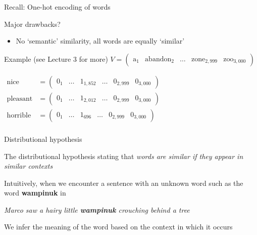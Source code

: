 \documentclass[12pt,aspectratio=169,handout]{beamer}
\begin{document}
\begin{frame}{Recall: One-hot encoding of words}
	
Major drawbacks?

\begin{itemize}
	\item No `semantic' similarity, all words are equally `similar'
\end{itemize}

\begin{block}{Example (see Lecture 3 for more)}
	$
	V = \begin{pmatrix}
		\text{a}_1 & \text{abandon}_2 & \ldots & \text{zone}_{2,999} & \text{zoo}_{3,000}
	\end{pmatrix}
	$
	
	\bigskip
	$
	\begin{aligned}
		\text{nice} &= 
		\begin{pmatrix}
			0_1 & \ldots & 1_{1,852} & \ldots & 0_{2,999} & 0_{3,000}
		\end{pmatrix} \\
		\text{pleasant} &= 
		\begin{pmatrix}
			0_1 & \ldots & 1_{2,012} & \ldots & 0_{2,999} & 0_{3,000}
		\end{pmatrix} \\
		\text{horrible} &= 
		\begin{pmatrix}
			0_1 & \ldots & 1_{696} & \ldots & 0_{2,999} & 0_{3,000}
		\end{pmatrix} \\
	\end{aligned}
	$
	
\end{block}


\end{frame}

\begin{frame}{Distributional hypothesis}

The distributional hypothesis stating that \emph{words are similar if they appear in similar contexts}

\begin{example}
Intuitively, when we encounter a sentence with an unknown word such as the word \textbf{wampinuk} in

\pause
\emph{Marco saw a hairy little \textbf{wampinuk} crouching behind a tree}

We infer the meaning of the word based on the context in which it occurs
\end{example}

\end{frame}
\end{document}
